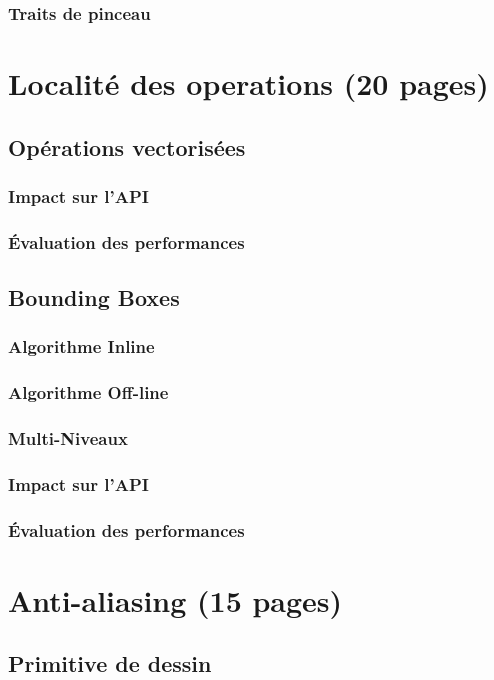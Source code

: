 		\subsection{Traits de pinceau}

\chapter{Localité des operations (20 pages)}
	\section{Opérations vectorisées}
		\subsection{Impact sur l'API}
		\subsection{Évaluation des performances}
	\section{Bounding Boxes}
		\subsection{Algorithme Inline}
		\subsection{Algorithme Off-line}
		\subsection{Multi-Niveaux}
		\subsection{Impact sur l'API}
		\subsection{Évaluation des performances}

\chapter{Anti-aliasing (15 pages) }
	\section{Primitive de dessin}
